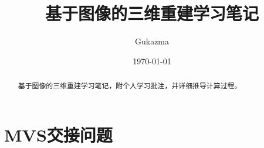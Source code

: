 \documentclass[fontset=windows]{article}
\title{\heiti\zihao{2} 基于图像的三维重建学习笔记}
\author{\songti Gukazma}
\date{\today}
\begin{document}
	\maketitle
	\thispagestyle{empty}

\begin{abstract}
	基于图像的三维重建学习笔记，附个人学习批注，并详细推导计算过程。
\end{abstract}

\tableofcontents

\section{MVS交接问题}



\end{document}
